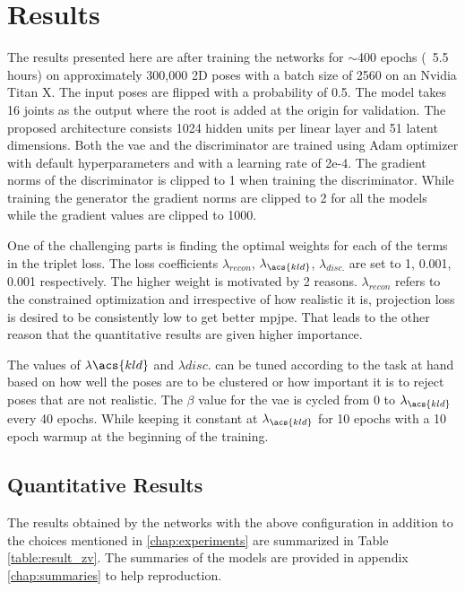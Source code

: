 \chapter{Results}
\label{chap:results}
The results presented here are after training the networks for $\sim$400 epochs (~5.5 hours) on approximately 300,000 2D poses with a batch size of 2560 on an Nvidia Titan X. The input poses are flipped with a probability of 0.5. The model takes 16 joints as the output where the root is added at the origin for validation. The proposed architecture consists 1024 hidden units per linear layer and 51 latent dimensions. Both the \ac{vae} and the discriminator are trained using Adam optimizer with default hyperparameters and with a learning rate of 2e-4. The gradient norms of the discriminator is clipped to 1 when training the discriminator. While training the generator the gradient norms are clipped to 2 for all the models while the gradient values are clipped to 1000.

One of the challenging parts is finding the optimal weights for each of the terms in the triplet loss. The loss coefficients $\lambda_{recon}$, $\lambda_{\acs{kld}}$, $\lambda_{disc.}$ are set to 1, 0.001, 0.001 respectively. The higher weight is motivated by 2 reasons. $\lambda_{recon}$ refers to the constrained optimization and irrespective of how realistic it is, projection loss is desired to be consistently low to get better \ac{mpjpe}. That leads to the other reason that the quantitative results are given higher importance.

The values of $\lambda{\acs{kld}}$ and $\lambda{disc.}$ can be tuned according to the task at hand based on how well the poses are to be clustered or how important it is to reject poses that are not realistic. The $\beta$ value for the \ac{vae} is cycled from 0 to $\lambda_{\acs{kld}}$ every 40 epochs. While keeping it constant at $\lambda_{\acs{kld}}$ for 10 epochs with a 10 epoch warmup at the beginning of the training.

\section{Quantitative Results}

The results obtained by the networks with the above configuration in addition to the choices mentioned in \ref{chap:experiments} are summarized in Table \ref{table:result_zv}. The summaries of the models are provided in appendix \ref{chap:summaries} to help reproduction.

